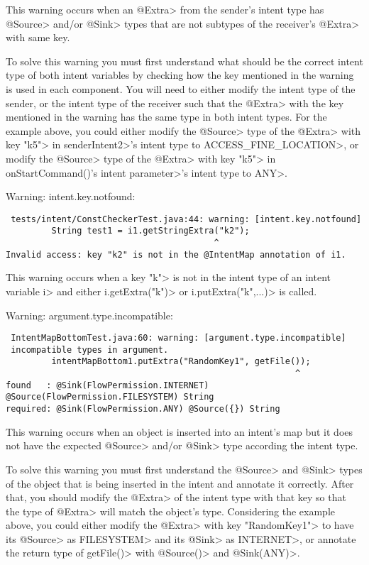 This warning occurs when an \<@Extra> from the sender's intent type has
\<@Source> and/or \<@Sink> types that are not subtypes of the receiver's
\<@Extra> with same key.

To solve this warning you must first understand what should be the correct
intent type of both intent variables by checking how the key mentioned in the
warning is used in each component. You will need to either modify the intent type of
the sender, or the intent type of the receiver such that the \<@Extra> with the
key mentioned in the warning has the same type in both intent types. For the
example above, you could either modify the \<@Source> type of the \<@Extra> with
key \<"k5"> in \<senderIntent2>'s intent type to \<ACCESS\_FINE\_LOCATION>, or
modify the \<@Source> type of the \<@Extra> with key \<"k5"> 
in \<onStartCommand()'s intent parameter>'s intent type to \<ANY>.

\bigskip
\noindent
Warning: intent.key.notfound:

\begin{Verbatim}
 tests/intent/ConstCheckerTest.java:44: warning: [intent.key.notfound] 
         String test1 = i1.getStringExtra("k2");
                                         ^
Invalid access: key "k2" is not in the @IntentMap annotation of i1.
\end{Verbatim}

This warning occurs when a key \<"k"> is not in the intent
type of an intent variable \<i> and either \<i.getExtra("k")> or 
\<i.putExtra("k",...)> is called.

\bigskip
\noindent
Warning: argument.type.incompatible:

\begin{Verbatim}
 IntentMapBottomTest.java:60: warning: [argument.type.incompatible] 
 incompatible types in argument.
         intentMapBottom1.putExtra("RandomKey1", getFile());
                                                         ^
found   : @Sink(FlowPermission.INTERNET) @Source(FlowPermission.FILESYSTEM) String
required: @Sink(FlowPermission.ANY) @Source({}) String
\end{Verbatim}

This warning occurs when an object is inserted into an intent's map but it
does not have the expected \<@Source> and/or \<@Sink> type according the
intent type.

To solve this warning you must first understand the \<@Source> and \<@Sink>
types of the object that is being inserted in the intent and annotate it
correctly. After that, you should modify the \<@Extra> of the
intent type with that key so that the type of \<@Extra> will match the object's
type. Considering the example above, you could either modify the \<@Extra> with
key \<"RandomKey1"> to have its \<@Source> as \<FILESYSTEM> and its \<@Sink> as
\<INTERNET>, or annotate the return type of
\<getFile()> with \<@Source({})> and \<@Sink(ANY)>.

